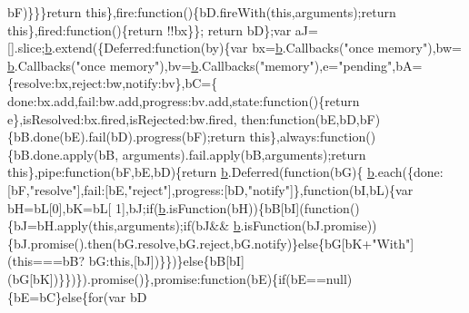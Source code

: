 \begin{DoxyCode}
      bF)\}\}\}\textcolor{keywordflow}{return} \textcolor{keyword}{this}\},fire:\textcolor{keyword}{function}()\{bD.fireWith(\textcolor{keyword}{this},arguments);\textcolor{keywordflow}{return} \textcolor{keyword}{this}\},fired:\textcolor{keyword}{function}()\{\textcolor{keywordflow}{return} !!bx\}\};\textcolor{keywordflow}{
      return} bD\};var aJ=[].slice;\hyperlink{docs_2_programmer's_manual_2html_2jquery_8js_aa4026ad5544b958e54ce5e106fa1c805}{b}.extend(\{Deferred:\textcolor{keyword}{function}(by)\{var bx=\hyperlink{docs_2_programmer's_manual_2html_2jquery_8js_aa4026ad5544b958e54ce5e106fa1c805}{b}.Callbacks(\textcolor{stringliteral}{"once memory"}),bw=
      \hyperlink{docs_2_programmer's_manual_2html_2jquery_8js_aa4026ad5544b958e54ce5e106fa1c805}{b}.Callbacks(\textcolor{stringliteral}{"once memory"}),bv=\hyperlink{docs_2_programmer's_manual_2html_2jquery_8js_aa4026ad5544b958e54ce5e106fa1c805}{b}.Callbacks(\textcolor{stringliteral}{"memory"}),e=\textcolor{stringliteral}{"pending"},bA=\{resolve:bx,reject:bw,notify:bv\},bC=\{
      done:bx.add,fail:bw.add,progress:bv.add,state:\textcolor{keyword}{function}()\{\textcolor{keywordflow}{return} e\},isResolved:bx.fired,isRejected:bw.fired,
      then:\textcolor{keyword}{function}(bE,bD,bF)\{bB.done(bE).fail(bD).progress(bF);\textcolor{keywordflow}{return} \textcolor{keyword}{this}\},always:\textcolor{keyword}{function}()\{bB.done.apply(bB,
      arguments).fail.apply(bB,arguments);\textcolor{keywordflow}{return} \textcolor{keyword}{this}\},pipe:\textcolor{keyword}{function}(bF,bE,bD)\{\textcolor{keywordflow}{return} \hyperlink{docs_2_programmer's_manual_2html_2jquery_8js_aa4026ad5544b958e54ce5e106fa1c805}{b}.Deferred(\textcolor{keyword}{function}(bG)\{
      \hyperlink{docs_2_programmer's_manual_2html_2jquery_8js_aa4026ad5544b958e54ce5e106fa1c805}{b}.each(\{done:[bF,\textcolor{stringliteral}{"resolve"}],fail:[bE,\textcolor{stringliteral}{"reject"}],progress:[bD,\textcolor{stringliteral}{"notify"}]\},\textcolor{keyword}{function}(bI,bL)\{var bH=bL[0],bK=bL[
      1],bJ;\textcolor{keywordflow}{if}(\hyperlink{docs_2_programmer's_manual_2html_2jquery_8js_aa4026ad5544b958e54ce5e106fa1c805}{b}.isFunction(bH))\{bB[bI](\textcolor{keyword}{function}()\{bJ=bH.apply(\textcolor{keyword}{this},arguments);\textcolor{keywordflow}{if}(bJ&&
      \hyperlink{docs_2_programmer's_manual_2html_2jquery_8js_aa4026ad5544b958e54ce5e106fa1c805}{b}.isFunction(bJ.promise))\{bJ.promise().then(bG.resolve,bG.reject,bG.notify)\}\textcolor{keywordflow}{else}\{bG[bK+\textcolor{stringliteral}{"With"}](\textcolor{keyword}{this}===bB?
      bG:\textcolor{keyword}{this},[bJ])\}\})\}\textcolor{keywordflow}{else}\{bB[bI](bG[bK])\}\})\}).promise()\},promise:\textcolor{keyword}{function}(bE)\{\textcolor{keywordflow}{if}(bE==null)\{bE=bC\}\textcolor{keywordflow}{else}\{\textcolor{keywordflow}{for}(var bD 

\end{DoxyCode}

